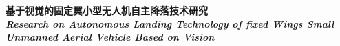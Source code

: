 \begin{center}
    \begin{center} %
        \huge{\textbf{基于视觉的固定翼小型无人机自主降落技术研究}}\\
        \emph{\Large{\textbf{
            Research on Autonomous Landing Technology of fixed Wings Small Unmanned Aerial Vehicle Based on Vision
        }}}\\     
    \end{center}
\end{center}